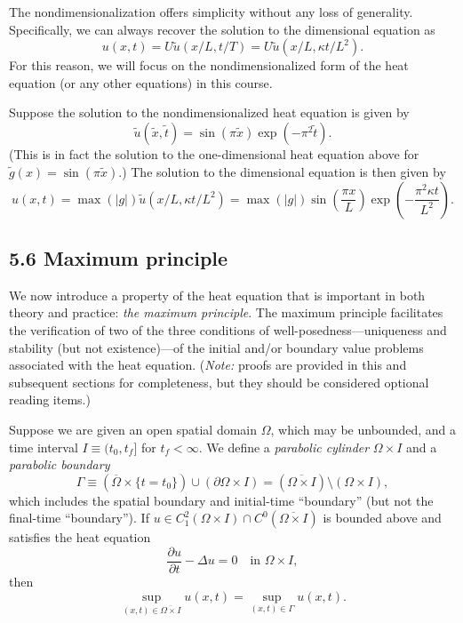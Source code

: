 The nondimensionalization offers simplicity without any loss of generality. Specifically, we can always recover the solution to the dimensional equation as
\[u(x, t) = U\tilde{u}(x/L, t/T) = U\tilde{u}(x/L, \kappa t/L^2).\]
For this reason, we will focus on the nondimensionalized form of the heat equation (or any other equations) in this course.

\begin{example}[Nondimensionalization][5.2]
    Suppose the solution to the nondimensionalized heat equation is given by
    \[\tilde{u}(\tilde{x}, \tilde{t}) = \sin(\pi\tilde{x}) \exp(-\pi^2 \tilde{t}).\]
    (This is in fact the solution to the one-dimensional heat equation above for $\tilde{g}(x) = \sin(\pi\tilde{x})$.) The solution to the dimensional equation is then given by
    \[u(x, t) = \max(|g|) \tilde{u}(x/L, \kappa t/L^2) = \max(|g|) \sin\left(\frac{\pi x}{L}\right) \exp\left(-\frac{\pi^2 \kappa t}{L^2}\right).\]
\end{example}

\subsection{5.6 Maximum principle}
We now introduce a property of the heat equation that is important in both theory and practice: \textit{the maximum principle}. The maximum principle facilitates the verification of two of the three conditions of well-posedness---uniqueness and stability (but not existence)---of the initial and/or boundary value problems associated with the heat equation. (\textit{Note:} proofs are provided in this and subsequent sections for completeness, but they should be considered optional reading items.)

\begin{theorem}
    Suppose we are given an open spatial domain $\Omega$, which may be unbounded, and a time interval $I \equiv (t_0, t_f]$ for $t_f < \infty$. We define a \textit{parabolic cylinder} $\Omega \times I$ and a \textit{parabolic boundary}
    \[\Gamma \equiv (\overline{\Omega} \times \{t = t_0\}) \cup (\partial\Omega \times I) = (\overline{\Omega \times I}) \setminus (\Omega \times I),\]
    which includes the spatial boundary and initial-time ``boundary'' (but not the final-time ``boundary''). If $u \in C_1^2(\Omega \times I) \cap C^0(\overline{\Omega \times I})$ is bounded above and satisfies the heat equation
    \[\frac{\partial u}{\partial t} - \Delta u = 0 \quad \text{in } \Omega \times I,\]
    then
    \[\sup_{(x,t) \in \overline{\Omega \times I}} u(x, t) = \sup_{(x,t) \in \Gamma} u(x, t).\]
\end{theorem}

